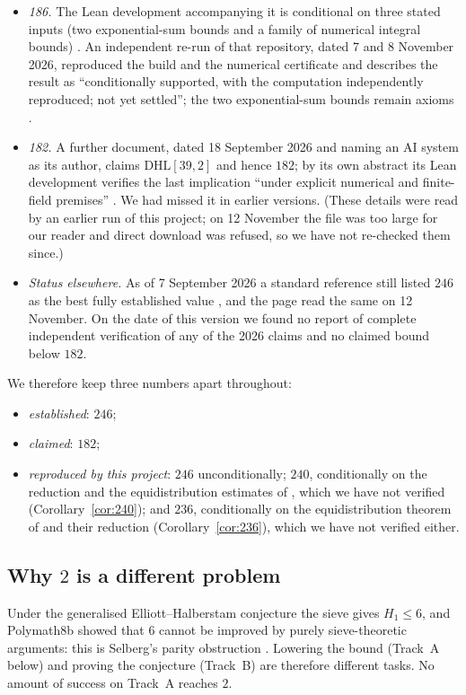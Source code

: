 \documentclass[11pt]{amsart}
\theoremstyle{definition}
\theoremstyle{remark}
\newcommand{\DHL}{\mathrm{DHL}}
\begin{document}
\begin{itemize}
\item \emph{186.} The Lean development accompanying it is conditional on three
stated inputs (two exponential-sum bounds and a family of numerical integral
bounds) \cite{OAI26}. An independent re-run of that repository, dated 7 and 8
November 2026, reproduced the build and the numerical certificate and describes
the result as ``conditionally supported, with the computation independently
reproduced; not yet settled''; the two exponential-sum bounds remain axioms
\cite{NM26}.
\item \emph{182.} A further document, dated 18 September 2026 and naming an AI
system as its author, claims $\DHL[39,2]$ and hence $182$; by its own abstract
its Lean development verifies the last implication ``under explicit numerical
and finite-field premises'' \cite{Sha26}. We had missed it in earlier versions.
(These details were read by an earlier run of this project; on 12 November the
file was too large for our reader and direct download was refused, so we have
not re-checked them since.)
\item \emph{Status elsewhere.} As of 7 September 2026 a standard reference still
listed $246$ as the best fully established value \cite{MW}, and the page read
the same on 12 November. On the date of this version we found no report of
complete independent verification of any of the 2026 claims and no claimed
bound below $182$.
\end{itemize}

We therefore keep three numbers apart throughout:
\begin{itemize}
\item \emph{established}: $246$;
\item \emph{claimed}: $182$;
\item \emph{reproduced by this project}: $246$ unconditionally; $240$,
conditionally on the reduction \cite[Prop.~1]{Sta26} and the equidistribution
estimates of \cite{Sta26}, which we have not verified (Corollary~\ref{cor:240});
and $236$, conditionally on the equidistribution theorem of \cite{SY26} and
their reduction \cite[Thm.~4.33, \S\S4.12--4.14]{SY26}
(Corollary~\ref{cor:236}), which we have not verified either.
\end{itemize}

\subsection*{Why \texorpdfstring{$2$}{2} is a different problem}
Under the generalised Elliott--Halberstam conjecture the sieve gives $H_1\le6$,
and Polymath8b showed that $6$ cannot be improved by purely sieve-theoretic
arguments: this is Selberg's parity obstruction \cite{Pol14b}. Lowering the
bound (Track~A below) and proving the conjecture (Track~B) are therefore
different tasks. No amount of success on Track~A reaches $2$.
\end{document}
